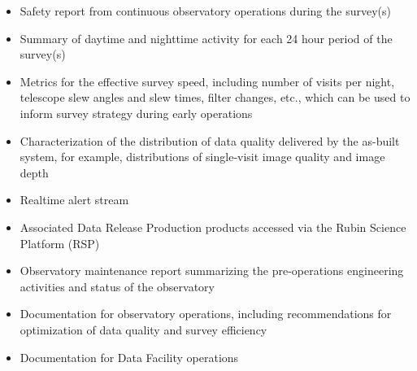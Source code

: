 \begin{itemize}
\item Safety report from continuous observatory operations during the survey(s)
\item Summary of daytime and nighttime activity for each 24 hour period of the survey(s)
\item Metrics for the effective survey speed, including number of visits per night, telescope slew angles and slew times, filter changes, etc., which can be used to inform survey strategy during early operations
\item Characterization of the distribution of data quality delivered by the as-built system, for example, distributions of single-visit image quality and image depth
\item Realtime alert stream
\item Associated Data Release Production products accessed via the Rubin Science Platform (RSP)
\item Observatory maintenance report summarizing the pre-operations engineering activities and status of the observatory
\item Documentation for observatory operations, including recommendations for optimization of data quality and survey efficiency
\item Documentation for Data Facility operations
\end{itemize}
